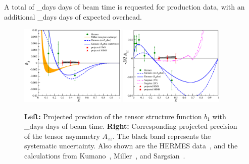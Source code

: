 A
total of \production_days days of beam time is requested for production data, with an additional \overhead_days days of expected overhead.


\begin{figure}
\begin{center}
\includegraphics[width=0.45\textwidth]{figs/plots0705/b1_proj_newmiller_lin.eps}
\hspace{0.5cm}
\includegraphics[width=0.45\textwidth]{figs/plots0705/Azz_proj_lin.eps}
\caption{\label{PROJ}
{\bf Left: }
Projected precision of the tensor structure function $b_1$  with \production_days days of beam time.
{\bf Right:} Corresponding projected precision of the tensor asymmetry $A_{zz}$. 
The black band
represents the systematic uncertainty.
Also shown are the HERMES data~\cite{Airapetian:2005cb}, and the calculations from Kumano~\cite{Kumano:2010vz}, Miller~\cite{Miller:1989nc,Miller_tmp}, and Sargsian~\cite{MISAK}.
}
\end{center}
\end{figure}
%


